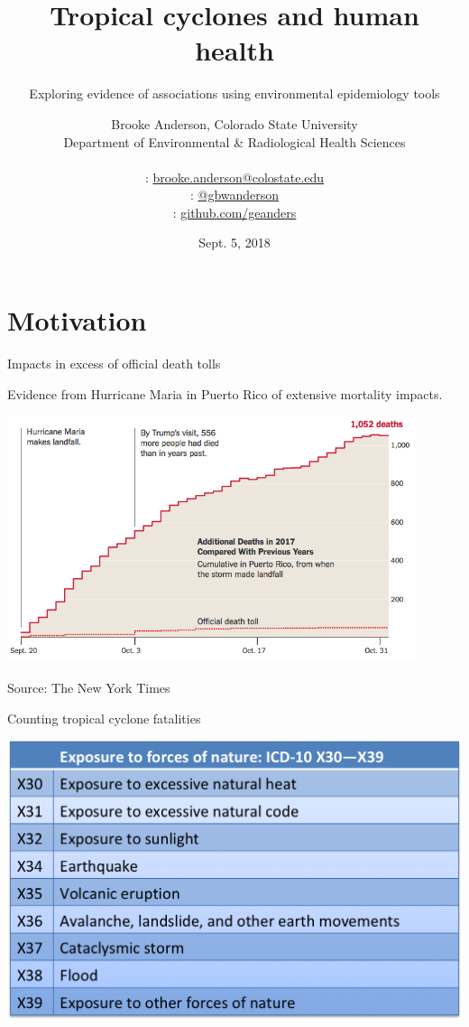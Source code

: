 \documentclass[ignorenonframetext,]{beamer}
\title{Tropical cyclones and human health}
\subtitle{Exploring evidence of associations using environmental epidemiology tools}
\date{Sept. 5, 2018}
\author[Anderson]{
  Brooke Anderson, Colorado State University \\
  Department of Environmental \& Radiological Health Sciences \\ \\
  {\small \faEnvelope: \url{brooke.anderson@colostate.edu}} \\
  {\small \faTwitter: \href{www.twitter.com/gbwanderson}{@gbwanderson}} \\
  {\small \faGithub:  \url{github.com/geanders}} \\ 
  }
\date{}
\begin{document}
\begin{frame}
  \titlepage
\end{frame}

\section{Motivation}\label{motivation}

\begin{frame}{Impacts in excess of official death tolls}

Evidence from Hurricane Maria in Puerto Rico of extensive mortality
impacts.

\begin{center}\includegraphics[width=0.9\textwidth]{figures/maria_excess_deaths.png} \end{center}

\footnotesize Source: The New York Times

\end{frame}

\begin{frame}{Counting tropical cyclone fatalities}

\begin{center}\includegraphics[width=\textwidth]{figures/icd_disaster_codes} \end{center}

\end{frame}
\end{document}
